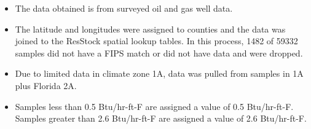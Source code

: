 \begin{itemize}
\item The data obtained is from surveyed oil and gas well data.
\item The latitude and longitudes were assigned to counties and the data was joined to the ResStock spatial lookup tables. In this process, 1482 of 59332 samples did not have a FIPS match or did not have data and were dropped.
\item Due to limited data in climate zone 1A, data was pulled from samples in 1A plus Florida 2A.
\item Samples less than 0.5 Btu/hr-ft-F are assigned a value of 0.5 Btu/hr-ft-F. Samples greater than 2.6 Btu/hr-ft-F are assigned a value of 2.6 Btu/hr-ft-F.
\end{itemize}
